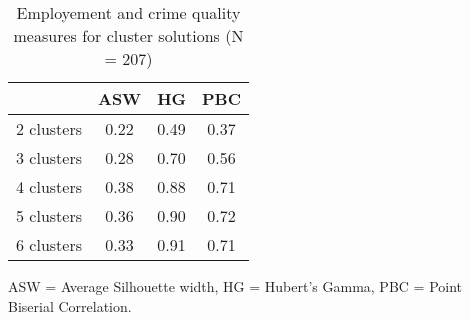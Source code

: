 \begin{table}[htp]
\footnotesize
\setlength{\tabcolsep}{35pt}
\renewcommand{\arraystretch}{1.3}
\begin{threeparttable}
\centering
\caption{Employement and crime quality measures for cluster solutions (N = 207)} 
\label{tab:quality_clusters_job_crime}
\begin{tabular}{lccc}
  \hline
 & ASW & HG & PBC \\ 
  \hline
2 clusters & 0.22 & 0.49 & 0.37 \\ 
  3 clusters & 0.28 & 0.70 & 0.56 \\ 
  4 clusters & 0.38 & 0.88 & 0.71 \\ 
  5 clusters & 0.36 & 0.90 & 0.72 \\ 
  6 clusters & 0.33 & 0.91 & 0.71 \\ 
   \hline
\end{tabular}
\begin{tablenotes}
\scriptsize
\item ASW = Average Silhouette width, HG = Hubert's Gamma, PBC = Point Biserial Correlation.
\end{tablenotes}
\end{threeparttable}
\end{table}
